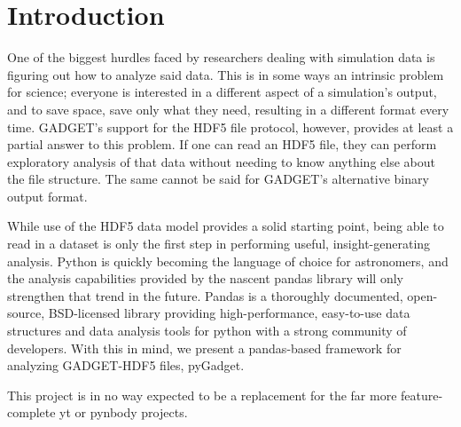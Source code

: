 \section{Introduction}
\label{intro}

One of the biggest hurdles faced by researchers dealing with simulation data is figuring out how to analyze said data.  This is in some ways an intrinsic problem for science; everyone is interested in a different aspect of a simulation’s output, and to save space, save only what they need, resulting in a different format every time.  GADGET’s support for the HDF5 file protocol, however, provides at least a partial answer to this problem.  If one can read an HDF5 file, they can perform exploratory analysis of that data without needing to know anything else about the file structure.  The same cannot be said for GADGET’s alternative binary output format.  

While use of the HDF5 data model provides a solid starting point, being able to read in a dataset is only the first step in performing useful, insight-generating analysis.  Python is quickly becoming the language of choice for astronomers, and the analysis capabilities provided by the nascent pandas library will only strengthen that trend in the future.  Pandas is a thoroughly documented, open-source, BSD-licensed library providing high-performance, easy-to-use data structures and data analysis tools for python with a strong community of developers. With this in mind, we present a pandas-based framework for analyzing GADGET-HDF5 files, pyGadget.

This project is in no way expected to be a replacement for the far more feature-complete yt or pynbody projects.